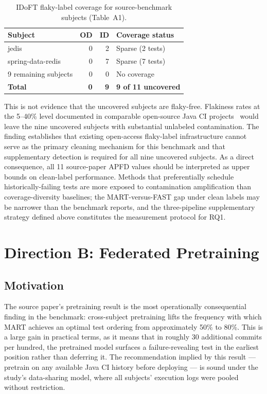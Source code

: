 \documentclass[conference]{IEEEtran}
\begin{document}
\begin{table}[t]
\caption{IDoFT flaky-label coverage for source-benchmark subjects (Table~A1).}
\centering
\begin{tabular}{lrrl}
\toprule
\textbf{Subject} & \textbf{OD} & \textbf{ID} & \textbf{Coverage status} \\
\midrule
jedis & 0 & 2 & Sparse (2 tests) \\
spring-data-redis & 0 & 7 & Sparse (7 tests) \\
9 remaining subjects & 0 & 0 & No coverage \\
\midrule
\textbf{Total} & \textbf{0} & \textbf{9} & \textbf{9 of 11 uncovered} \\
\bottomrule
\end{tabular}
\end{table}

This is not evidence that the uncovered subjects are flaky-free. Flakiness rates at the 5--40\% level documented in comparable open-source Java CI projects~\cite{lam2019} would leave the nine uncovered subjects with substantial unlabeled contamination. The finding establishes that existing open-access flaky-label infrastructure cannot serve as the primary cleaning mechanism for this benchmark and that supplementary detection is required for all nine uncovered subjects. As a direct consequence, all 11 source-paper APFD values should be interpreted as upper bounds on clean-label performance. Methods that preferentially schedule historically-failing tests are more exposed to contamination amplification than coverage-diversity baselines; the MART-versus-FAST gap under clean labels may be narrower than the benchmark reports, and the three-pipeline supplementary strategy defined above constitutes the measurement protocol for RQ1.



\section{Direction B: Federated Pretraining}

\subsection{Motivation}

The source paper's pretraining result is the most operationally consequential finding in the benchmark: cross-subject pretraining lifts the frequency with which MART achieves an optimal test ordering from approximately 50\% to 80\%. This is a large gain in practical terms, as it means that in roughly 30 additional commits per hundred, the pretrained model surfaces a failure-revealing test in the earliest position rather than deferring it. The recommendation implied by this result — pretrain on any available Java CI history before deploying — is sound under the study's data-sharing model, where all subjects' execution logs were pooled without restriction.
\end{document}
